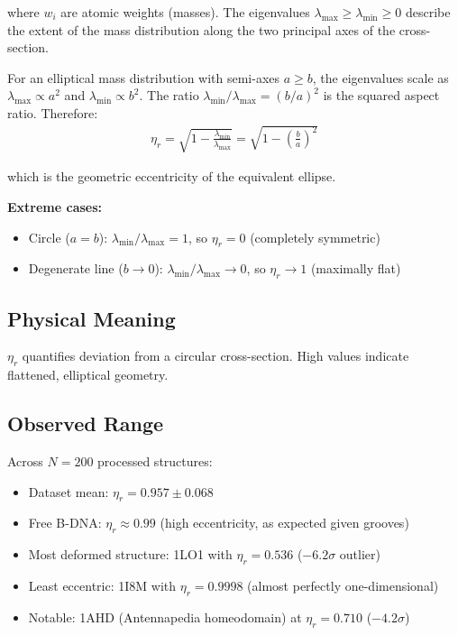 where $w_i$ are atomic weights (masses). The eigenvalues $\lambda_{\max} \geq \lambda_{\min} \geq 0$ describe the extent of the mass distribution along the two principal axes of the cross-section.

For an elliptical mass distribution with semi-axes $a \geq b$, the eigenvalues scale as $\lambda_{\max} \propto a^2$ and $\lambda_{\min} \propto b^2$. The ratio $\lambda_{\min}/\lambda_{\max} = (b/a)^2$ is the squared aspect ratio. Therefore:
\begin{align}
    \eta_r = \sqrt{1 - \frac{\lambda_{\min}}{\lambda_{\max}}} = \sqrt{1 - \left(\frac{b}{a}\right)^2}
\end{align}

which is the geometric eccentricity of the equivalent ellipse.

\textbf{Extreme cases:}
\begin{itemize}
    \item Circle ($a = b$): $\lambda_{\min}/\lambda_{\max} = 1$, so $\eta_r = 0$ (completely symmetric)
    \item Degenerate line ($b \to 0$): $\lambda_{\min}/\lambda_{\max} \to 0$, so $\eta_r \to 1$ (maximally flat)
\end{itemize}

\subsection{Physical Meaning}

$\eta_r$ quantifies deviation from a circular cross-section. High values indicate flattened, elliptical geometry.

\subsection{Observed Range}

Across $N = 200$ processed structures:
\begin{itemize}
    \item Dataset mean: $\eta_r = 0.957 \pm 0.068$
    \item Free B-DNA: $\eta_r \approx 0.99$ (high eccentricity, as expected given grooves)
    \item Most deformed structure: 1LO1 with $\eta_r = 0.536$ ($-6.2\sigma$ outlier)
    \item Least eccentric: 1I8M with $\eta_r = 0.9998$ (almost perfectly one-dimensional)
    \item Notable: 1AHD (Antennapedia homeodomain) at $\eta_r = 0.710$ ($-4.2\sigma$)
\end{itemize}


